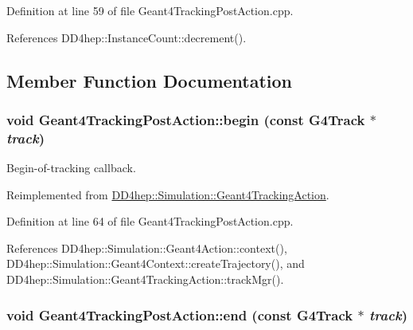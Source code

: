 Definition at line 59 of file Geant4TrackingPostAction.cpp.

References DD4hep::InstanceCount::decrement().

\subsection{Member Function Documentation}
\hypertarget{class_d_d4hep_1_1_simulation_1_1_geant4_tracking_post_action_a3460d57b0bf474e1b83a3302056cf716}{
\subsubsection[{begin}]{\setlength{\rightskip}{0pt plus 5cm}void Geant4TrackingPostAction::begin (const G4Track $\ast$ {\em track})}}
\label{class_d_d4hep_1_1_simulation_1_1_geant4_tracking_post_action_a3460d57b0bf474e1b83a3302056cf716}


Begin-\/of-\/tracking callback. 

Reimplemented from \hyperlink{class_d_d4hep_1_1_simulation_1_1_geant4_tracking_action_a65858867a7b71bf4f48b9f140bc9a88d}{DD4hep::Simulation::Geant4TrackingAction}.

Definition at line 64 of file Geant4TrackingPostAction.cpp.

References DD4hep::Simulation::Geant4Action::context(), DD4hep::Simulation::Geant4Context::createTrajectory(), and DD4hep::Simulation::Geant4TrackingAction::trackMgr().\hypertarget{class_d_d4hep_1_1_simulation_1_1_geant4_tracking_post_action_ac64fbbb53136a1696ac45c060fdcde70}{
\subsubsection[{end}]{\setlength{\rightskip}{0pt plus 5cm}void Geant4TrackingPostAction::end (const G4Track $\ast$ {\em track})}}
\label{class_d_d4hep_1_1_simulation_1_1_geant4_tracking_post_action_ac64fbbb53136a1696ac45c060fdcde70}


